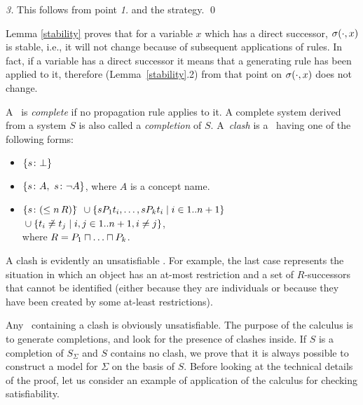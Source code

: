 \noindent
{\it 3.}
This follows from point {\it 1.} and the strategy.
\qed


Lemma \ref{stability} proves that for a variable $x$ which has a direct successor, 
$\sigma(\cdot,x)$ is stable, i.e., it will not change because of subsequent
applications of rules. In fact, if a variable has a direct successor it
means that a generating rule has been applied to it, therefore
(Lemma~\ref{stability}.2) from that point on $\sigma(\cdot,x)$
does not change.

A \cs\ is {\em complete\/} if no propagation rule applies to it.
A complete system derived from a system $S$ is also
called a {\em completion\/} of $S$.
A~{\em clash} is a \cs\ having one of the following forms:

\begin{itemize}
\item $\{s\colon\bot\}$
\item $\{s\colon A,\ s\colon\neg A\}$, where $A$ is a concept name.
\item  \begin{tabbing} 
              $\{s\colon(\leq n \, R)\}$\=  $\mbox{}
                      \cup  \{sP_1t_i ,\ldots, sP_kt_i \mid 
                                 i\in 1..n+1\} $ \\%
                            \>  $\mbox{} 
                      \cup  \{{t_i \not\doteq t_j} \mid 
                                  i,j \in 1..n+1, i \neq j\}$,   \\[0.8ex]  
                              where $R= P_1\sqcap\ldots\sqcap P_k$.
       \end{tabbing} 
\end{itemize}

A clash is evidently an unsatisfiable \cs. For example, the last
case represents the situation in which an object has 
an at-most restriction and
a set of $R$-successors that cannot be identified 
(either because they are individuals or because they
have been created by some at-least restrictions).

Any \cs\ containing a clash is obviously unsatisfiable. 
The purpose of the calculus is to generate completions, 
and look for the presence of clashes inside. If $S$ is a completion of $S_\Sigma$ 
and $S$ contains no clash, we prove that it is always possible to 
construct a model for $\Sigma$ on
the basis of $S$. Before looking at the technical details of the proof, 
let us consider an example of application of the calculus for checking
satisfiability.

